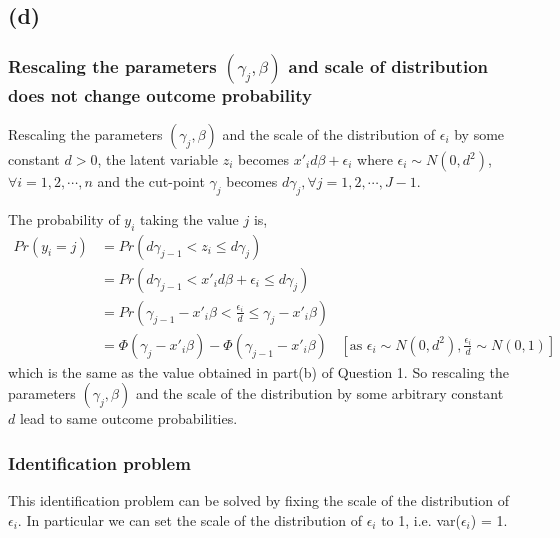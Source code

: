 \documentclass[a4paper]{article}
\begin{document}
\subsection*{(d)}

\subsubsection*{Rescaling the parameters $(\gamma_j,\beta)$ and scale of distribution does not change outcome probability}

Rescaling the parameters $(\gamma_j,\beta)$ and the scale of the distribution of $\epsilon_i$ by some constant $d > 0$, the latent variable $z_i$ becomes $x'_id\beta + \epsilon_i$ where $\epsilon_i \sim N(0,d^2)$, $\forall i = 1,2,\cdots,n$ and the cut-point $\gamma_j$ becomes $d\gamma_j, \forall j = 1, 2, \cdots, J-1$.
\vspace{0.25cm}

\noindent The probability of $y_i$ taking the value $j$ is,
\begin{align*}
    Pr(y_i=j) &= Pr(d\gamma_{j-1} < z_i \leq d\gamma_j) \\
              &= Pr(d\gamma_{j-1} < x'_i d\beta + \epsilon_i \leq d\gamma_j)\\
              &= Pr(\gamma_{j-1} - x'_i\beta < \frac{\epsilon_i}{d} \leq \gamma_j - x'_i\beta)\\
              &= \Phi(\gamma_j - x'_i\beta) - \Phi(\gamma_{j-1} - x'_i\beta) & [\text{as } \epsilon_i \sim N(0,d^2), \frac{\epsilon_i}{d} \sim N(0,1)]
\end{align*}
which is the same as the value obtained in part(b) of Question 1. So rescaling the parameters $(\gamma_j,\beta)$ and the scale of the distribution by some arbitrary constant $d$ lead to same outcome probabilities.

\subsubsection*{Identification problem}
This identification problem can be solved by fixing the scale of the distribution of $\epsilon_i$. In particular we can set the scale of the distribution of $\epsilon_i$ to 1, i.e. var($\epsilon_i$) = 1.

\pagebreak
\end{document}
